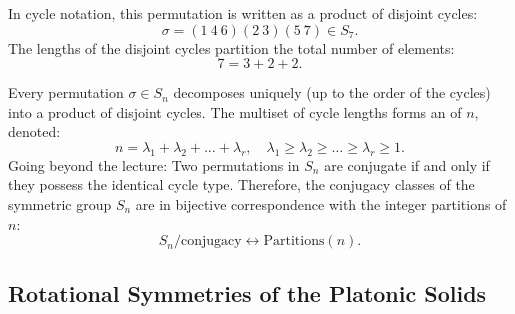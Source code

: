 \begin{content}
\begin{center}
\end{center}

In cycle notation, this permutation is written as a product of disjoint cycles:
\[
\sigma = (1\ 4\ 6)(2\ 3)(5\ 7) \in S_7.
\]
The lengths of the disjoint cycles partition the total number of elements:
\[
7 = 3 + 2 + 2.
\]

\begin{steps}
Every permutation $\sigma \in S_n$ decomposes uniquely (up to the order of the cycles) into a product of disjoint cycles. The multiset of cycle lengths forms an  of $n$, denoted:
\[
n = \lambda_1 + \lambda_2 + \dots + \lambda_r, \quad \lambda_1 \ge \lambda_2 \ge \dots \ge \lambda_r \ge 1.
\]
Going beyond the lecture: Two permutations in $S_n$ are conjugate if and only if they possess the identical cycle type. Therefore, the conjugacy classes of the symmetric group $S_n$ are in bijective correspondence with the integer partitions of $n$:
\[
S_n / \text{conjugacy} \longleftrightarrow \text{Partitions}(n).
\]
\end{steps}
\end{content}

\subsection{Rotational Symmetries of the Platonic Solids}

